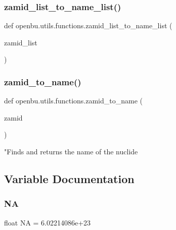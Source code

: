 \subsubsection{\texorpdfstring{zamid\+\_\+list\+\_\+to\+\_\+name\+\_\+list()}{zamid\_list\_to\_name\_list()}}
{\footnotesize\ttfamily def openbu.\+utils.\+functions.\+zamid\+\_\+list\+\_\+to\+\_\+name\+\_\+list (\begin{DoxyParamCaption}\item[{}]{zamid\+\_\+list }\end{DoxyParamCaption})}

\mbox{\label{namespaceopenbu_1_1utils_1_1functions_aac250c2d4812c7a1d696fcf0f457d2b3}} 
\subsubsection{\texorpdfstring{zamid\+\_\+to\+\_\+name()}{zamid\_to\_name()}}
{\footnotesize\ttfamily def openbu.\+utils.\+functions.\+zamid\+\_\+to\+\_\+name (\begin{DoxyParamCaption}\item[{}]{zamid }\end{DoxyParamCaption})}

\begin{DoxyVerb}"Finds and returns the name of the nuclide\end{DoxyVerb}
 

\subsection{Variable Documentation}
\mbox{\label{namespaceopenbu_1_1utils_1_1functions_a173b28b37e4ebe8e48623216fa95dcb1}} 
\subsubsection{\texorpdfstring{NA}{NA}}
{\footnotesize\ttfamily float NA = 6.\+02214086e+23}

